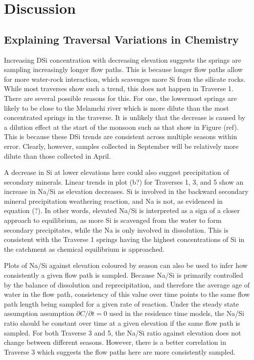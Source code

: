 

\section{Discussion}





\subsection{Explaining Traversal Variations in Chemistry}

Increasing DSi concentration with decreasing elevation suggests the springs are sampling increasingly longer flow paths. This is because longer flow paths allow for more water-rock interaction, which scavenges more Si from the silicate rocks. While most traverses show such a trend, this does not happen in Traverse 1. There are several possible reasons for this. For one, the lowermost springs are likely to be close to the Melamchi river which is more dilute than the most concentrated springs in the traverse. It is unlikely that the decrease is caused by a dilution effect at the start of the monsoon such as that show in Figure (ref). This is because these DSi trends are consistent across multiple seasons within error. Clearly, however, samples collected in September will be relatively more dilute than those collected in April.

\bsk

A decrease in Si at lower elevations here could also suggest precipitation of secondary minerals. Linear trends in plot (b?) for Traverses 1, 3, and 5 show an increase in Na/Si as elevation decreases. Si is involved in the backward secondary mineral precipitation weathering reaction, and Na is not, as evidenced in equation (?). In other words, elevated Na/Si is interpreted as a sign of a closer approach to equilibrium, as more Si is scavenged from the water to form secondary precipitates, while the Na is only involved in dissolution. This is consistent with the Traverse 1 springs having the highest concentrations of Si in the catchment as chemical equilibrium is approached. 

\bsk

Plots of Na/Si against elevation coloured by season can also be used to infer how consistently a given flow path is sampled. Because Na/Si is primarily controlled by the balance of dissolution and reprecipitation, and therefore the average age of water in the flow path, consistency of this value over time points to the same flow path length being sampled for a given rate of reaction. Under the steady state assumption assumption $\partial C/\partial t = 0$ used in the residence time models, the Na/Si ratio should be constant over time at a given elevation if the same flow path is sampled. For both Traverse 3 and 5, the Na/Si ratio against elevation does not change between different seasons. However, there is a better correlation in Traverse 3 which suggests the flow paths here are more consistently sampled.

